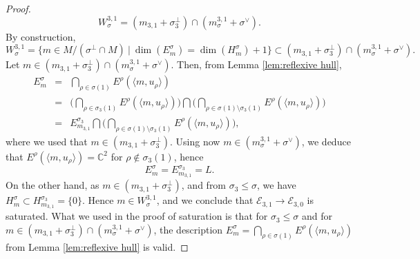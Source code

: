 \documentclass[a4paper,10pt]{amsart}
\theoremstyle{plain}{
    \newtheorem{theorem}{Theorem}[section]
    \newtheorem{lemma}[theorem]{Lemma}
    \newtheorem{corollary}[theorem]{Corollary}
    \newtheorem{proposition}[theorem]{Proposition}
    \newtheorem{conjecture}[theorem]{Conjecture}
}
\theoremstyle{definition}{
    \newtheorem{definition}[theorem]{Definition}
    \newtheorem{defn-thm}[theorem]{Definition-Theorem}
    \newtheorem{example}[theorem]{Example}
    \newtheorem{notation}[theorem]{Notation}
}
\theoremstyle{remark}{
    \newtheorem{remark}[theorem]{Remark}
    \newtheorem{problem}[theorem]{Problem}
    \newtheorem{question}[theorem]{Question}
}
\def\cE{\mathcal{E}}
\def\C{\mathbb{C}}
\begin{document}
\begin{proof}
 $$
 W^{3,1}_\sigma= (m_{3,1}+\sigma_3^\perp)\cap (m^{3,1}_\sigma+\sigma^\vee).
 $$
 By construction, 
 $$
 W^{3,1}_\sigma=\lbrace m\in M/(\sigma^\perp\cap M)\:\vert\: \dim(E^\sigma_m)=\dim(H^\sigma_m)+1\rbrace\subset(m_{3,1}+\sigma_3^\perp)\cap (m^{3,1}_\sigma+\sigma^\vee).
 $$
 Let $m\in (m_{3,1}+\sigma_3^\perp)\cap (m^{3,1}_\sigma+\sigma^\vee)$. Then, from Lemma \ref{lem:reflexive hull},
 \begin{equation*}
 \begin{array}{ccc}
 E^\sigma_m & = &\displaystyle\bigcap_{\rho\in\sigma(1)} E^\rho (\langle m, u_\rho \rangle) \\
            & = &\displaystyle\Big( \bigcap_{\rho\in\sigma_3(1)} E^\rho (\langle m, u_\rho \rangle) \Big) \bigcap \Big( \bigcap_{\rho\in\sigma(1)\setminus\sigma_3(1)} E^\rho (\langle m, u_\rho \rangle) \Big) \\
        & = & \displaystyle E^{\sigma_3}_{m_{3,1}}\bigcap \Big(\bigcap_{\rho\in\sigma(1)\setminus\sigma_3(1)} E^\rho(\langle m, u_\rho \rangle)\Big),
 \end{array}
 \end{equation*}
 where we used that
 $m\in (m_{3,1}+\sigma_3^\perp)$. Using now $m\in  (m^{3,1}_\sigma+\sigma^\vee)$, we deduce that $E^\rho(\langle m, u_\rho \rangle)=\C^2$ for $\rho\notin\sigma_3(1)$, hence 
 $$
 E^\sigma_m=E^{\sigma_3}_{m_{3,1}}=L.
 $$
 On the other hand, as $m\in (m_{3,1}+\sigma_3^\perp)$, and from $\sigma_3\leq \sigma$, we have $H^\sigma_m\subset H^{\sigma_3}_{m_{3,1}}=\lbrace 0\rbrace$. Hence $m\in  W^{3,1}_\sigma$, and we conclude that $\cE_{3,1}\to\cE_{3,0}$ is saturated. What we used in the proof of saturation is that for $\sigma_3\leq\sigma$ and for $m\in (m_{3,1}+\sigma_3^\perp)\cap (m^{3,1}_\sigma+\sigma^\vee)$, the description $E^\sigma_m  = \displaystyle\bigcap_{\rho\in\sigma(1)} E^\rho (\langle m, u_\rho \rangle)$ from Lemma \ref{lem:reflexive hull} is valid. 
 

\end{proof}
\end{document}
